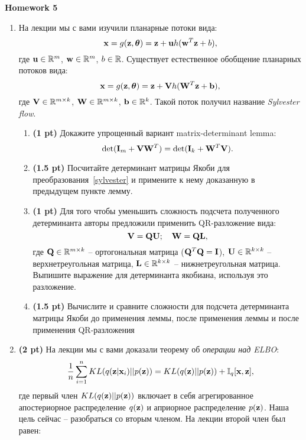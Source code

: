 \documentclass{article}
\begin{document}
\begin{center}
    {\Large \textbf{Homework 5}} \\
\end{center}

\begin{enumerate}
    \item На лекции мы с вами изучили планарные потоки вида:
    \begin{equation}
    	\mathbf{x} = g(\mathbf{z}, \boldsymbol{\theta}) = \mathbf{z} + \mathbf{u} h(\mathbf{w}^T\mathbf{z} + b),
    \end{equation}
    где $\mathbf{u} \in \mathbb{R}^m$,  $\mathbf{w} \in \mathbb{R}^m$, $b \in \mathbb{R}$.
    Существует естественное обобщение планарных потоков вида:
    \begin{equation}
    	\mathbf{x} = g(\mathbf{z}, \boldsymbol{\theta}) = \mathbf{z} + \mathbf{V} h(\mathbf{W}^T\mathbf{z} + \mathbf{b}),
    	\label{sylvester}
    \end{equation}
    где $\mathbf{V} \in \mathbb{R}^{m \times k}$,  $\mathbf{W} \in \mathbb{R}^{m \times k}$, $\mathbf{b} \in \mathbb{R}^k$. Такой поток получил название \textit{Sylvester flow}.
    \begin{enumerate}
    	\item  \textbf{(1 pt)} Докажите упрощенный вариант matrix-determinant lemma:
    	\[
    		\det (\mathbf{I}_m + \mathbf{V} \mathbf{W}^T) = \det (\mathbf{I}_k + \mathbf{W}^T \mathbf{V}).
    	\]
    	\item  \textbf{(1.5 pt)} Посчитайте детерминант матрицы Якоби для преобразования~\eqref{sylvester} и примените к нему доказанную в предыдущем пункте лемму.
    	\item  \textbf{(1 pt)} Для того чтобы уменьшить сложность подсчета полученного детерминанта авторы предложили применить QR-разложение вида:
    	\[
    		\mathbf{V} = \mathbf{Q} \mathbf{U}; \quad \mathbf{W} = \mathbf{Q} \mathbf{L},
    	\]
    	где $\mathbf{Q} \in \mathbb{R}^{m \times k}$ -- ортогональная матрица ($\mathbf{Q}^T \mathbf{Q} = \mathbf{I}$), $\mathbf{U} \in \mathbb{R}^{k \times k}$ -- верхнетреугольная матрица, $\mathbf{L} \in \mathbb{R}^{k \times k}$ -- нижнетреугольная матрица. Выпишите выражение для детерминанта якобиана, используя это разложение. 
    	\item  \textbf{(1.5 pt)} Вычислите и сравните сложности для подсчета детерминанта матрицы Якоби до применения леммы, после применения леммы и после применения QR-разложения
    \end{enumerate}
    
    \item  \textbf{(2 pt)} На лекции мы с вами доказали теорему об \textit{операции над ELBO}:
    \[
    	\frac{1}{n} \sum_{i=1}^n KL(q(\mathbf{z} | \mathbf{x}_i) || p(\mathbf{z})) = KL(q(\mathbf{z}) || p(\mathbf{z})) + \mathbb{I}_{q} [\mathbf{x}, \mathbf{z}],
    \]
    где первый член $KL(q(\mathbf{z}) || p(\mathbf{z}))$ включает в себя агрегированное апостериорное распределение $q(\mathbf{z})$ и априорное распределение $p(\mathbf{z})$. Наша цель сейчас -- разобраться со вторым членом. На лекции второй член был равен:


\end{enumerate}
\end{document}
